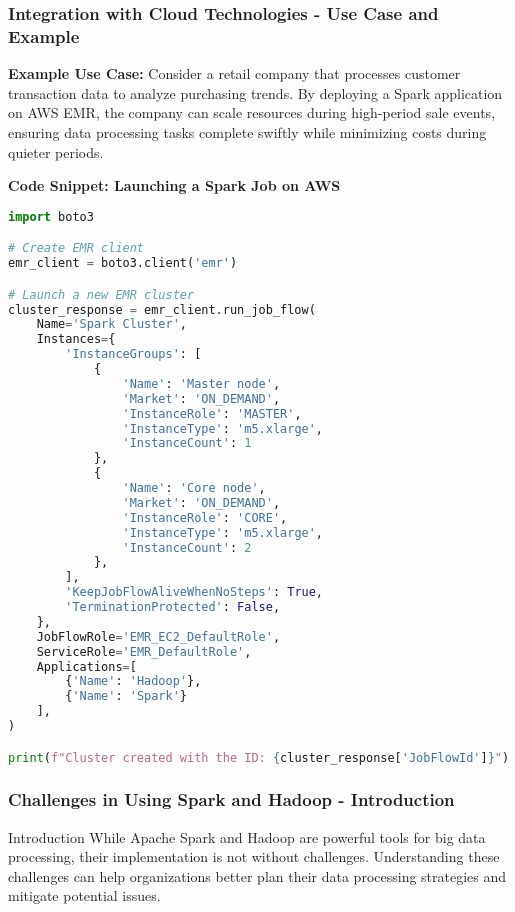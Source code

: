 \documentclass{beamer}
\begin{document}
\begin{frame}[fragile]
    \frametitle{Integration with Cloud Technologies - Use Case and Example}
    \textbf{Example Use Case:} 
    Consider a retail company that processes customer transaction data to analyze purchasing trends. By deploying a Spark application on AWS EMR, the company can scale resources during high-period sale events, ensuring data processing tasks complete swiftly while minimizing costs during quieter periods.
    
    \textbf{Code Snippet: Launching a Spark Job on AWS}
    \begin{lstlisting}[language=Python]
import boto3

# Create EMR client
emr_client = boto3.client('emr')

# Launch a new EMR cluster
cluster_response = emr_client.run_job_flow(
    Name='Spark Cluster',
    Instances={
        'InstanceGroups': [
            {
                'Name': 'Master node',
                'Market': 'ON_DEMAND',
                'InstanceRole': 'MASTER',
                'InstanceType': 'm5.xlarge',
                'InstanceCount': 1
            },
            {
                'Name': 'Core node',
                'Market': 'ON_DEMAND',
                'InstanceRole': 'CORE',
                'InstanceType': 'm5.xlarge',
                'InstanceCount': 2
            },
        ],
        'KeepJobFlowAliveWhenNoSteps': True,
        'TerminationProtected': False,
    },
    JobFlowRole='EMR_EC2_DefaultRole',
    ServiceRole='EMR_DefaultRole',
    Applications=[
        {'Name': 'Hadoop'},
        {'Name': 'Spark'}
    ],
)

print(f"Cluster created with the ID: {cluster_response['JobFlowId']}")
    \end{lstlisting}
\end{frame}

\begin{frame}[fragile]
    \frametitle{Challenges in Using Spark and Hadoop - Introduction}
    \begin{block}{Introduction}
        While Apache Spark and Hadoop are powerful tools for big data processing, their implementation is not without challenges. Understanding these challenges can help organizations better plan their data processing strategies and mitigate potential issues.
    \end{block}
\end{frame}
\end{document}

